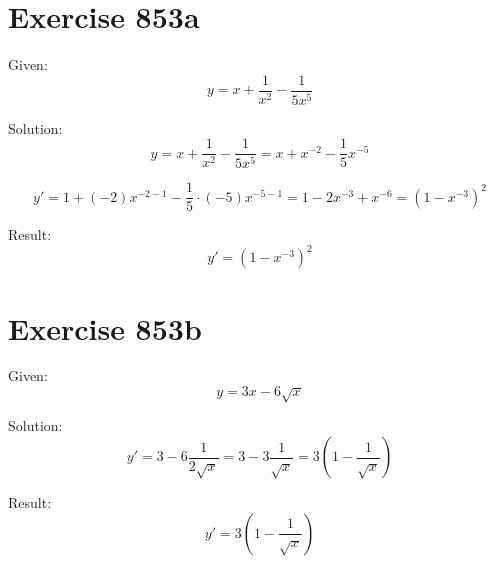 \documentclass[a4paper, 10pt]{scrartcl}
\begin{document}
\section{Exercise 853a}

Given:
\[
y = x + \frac{1}{x^{2}} - \frac{1}{5x^{5}}
\]

Solution:
\[
y = x + \frac{1}{x^{2}} - \frac{1}{5x^{5}} = x + x^{-2} - \frac{1}{5}x^{-5}
\]

\[
y' = 1 + (-2)x^{-2 - 1} - \frac{1}{5}\cdot(-5)x^{-5 - 1} = 1 - 2x^{-3} + x^{-6} = (1 - x^{-3})^{2}
\]

Result:
\[
y' = (1 - x^{-3})^{2}
\]

\section{Exercise 853b}

Given:
\[
y = 3x - 6\sqrt{x}
\]

Solution:
\[
y' = 3 - 6\frac{1}{2\sqrt{x}} = 3 - 3\frac{1}{\sqrt{x}} = 3(1 - \frac{1}{\sqrt{x}})
\]

Result:
\[
y' = 3(1 - \frac{1}{\sqrt{x}})
\]
\end{document}
